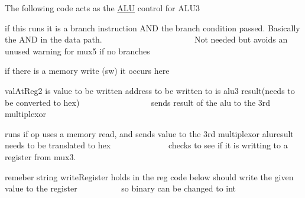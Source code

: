 The following code acts as the \mbox{\hyperlink{class_a_l_u}{A\+LU}} control for A\+L\+U3

if this runs it is a branch instruction A\+ND the branch condition passed. Basically the A\+ND in the data path. ~\newline
~\newline
~\newline
~\newline
~\newline
~\newline
~\newline
~\newline
~\newline
~\newline
~\newline
~\newline
~\newline
 Not needed but avoids an unused warning for mux5 if no branches

if there is a memory write (sw) it occurs here

val\+At\+Reg2 is value to be written address to be written to is alu3 result(needs to be converted to hex) ~\newline
~\newline
~\newline
~\newline
~\newline
~\newline
~\newline
~\newline
~\newline
~\newline
 sends result of the alu to the 3rd multiplexor

runs if op uses a memory read, and sends value to the 3rd multiplexor aluresult needs to be translated to hex ~\newline
~\newline
~\newline
~\newline
~\newline
~\newline
~\newline
~\newline
 checks to see if it is writting to a register from mux3.

remeber string write\+Register holds in the reg code below should write the given value to the register ~\newline
~\newline
~\newline
~\newline
~\newline
~\newline
 so binary can be changed to int

